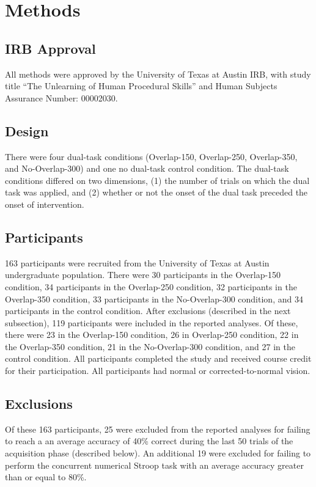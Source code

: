 \documentclass[apacite,draftfirst,man]{apa6}
\begin{document}
\section*{Methods}
\subsection*{IRB Approval}
All methods were approved by the University of Texas at Austin IRB, with study
title ``The Unlearning of Human Procedural Skills'' and Human Subjects Assurance
Number: 00002030.

\subsection*{Design} There were four dual-task conditions (Overlap-150,
Overlap-250, Overlap-350, and No-Overlap-300) and one no dual-task control
condition. The dual-task conditions differed on two dimensions, (1) the number
of trials on which the dual task was applied, and (2) whether or not the onset
of the dual task preceded the onset of intervention.

\subsection*{Participants} 163 participants were recruited from the University
of Texas at Austin undergraduate population. There were 30 participants in the
Overlap-150 condition, 34 participants in the Overlap-250 condition, 32
participants in the Overlap-350 condition, 33 participants in the No-Overlap-300
condition, and 34 participants in the control condition. After exclusions
(described in the next subsection), 119 participants were included in the
reported analyses. Of these, there were 23 in the Overlap-150 condition, 26 in
Overlap-250 condition, 22 in the Overlap-350 condition, 21 in the No-Overlap-300
condition, and 27 in the control condition. All participants completed the study
and received course credit for their participation. All participants had normal
or corrected-to-normal vision.

\subsection*{Exclusions}
Of these 163 participants, 25 were excluded from the reported analyses for
failing to reach a an average accuracy of 40\% correct during the last 50 trials
of the acquisition phase (described below). An additional 19 were excluded for
failing to perform the concurrent numerical Stroop task with an average accuracy
greater than or equal to 80\%.
\end{document}

